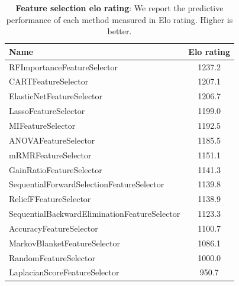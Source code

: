 \begin{table}[ht]
\caption{\textbf{Feature selection elo rating}: We report the predictive performance of each method measured in Elo rating. Higher is better.}
\label{table-results-performance-elo}
\centering
\small
\begin{tabular}{lc}
\toprule
\textbf{Name} & \textbf{Elo rating} \\
\midrule
RFImportanceFeatureSelector & 1237.2 \\
CARTFeatureSelector & 1207.1 \\
ElasticNetFeatureSelector & 1206.7 \\
LassoFeatureSelector & 1199.0 \\
MIFeatureSelector & 1192.5 \\
ANOVAFeatureSelector & 1185.5 \\
mRMRFeatureSelector & 1151.1 \\
GainRatioFeatureSelector & 1141.3 \\
SequentialForwardSelectionFeatureSelector & 1139.8 \\
ReliefFFeatureSelector & 1138.9 \\
SequentialBackwardEliminationFeatureSelector & 1123.3 \\
AccuracyFeatureSelector & 1100.7 \\
MarkovBlanketFeatureSelector & 1086.1 \\
RandomFeatureSelector & 1000.0 \\
LaplacianScoreFeatureSelector & 950.7 \\
\bottomrule
\end{tabular}
\end{table}